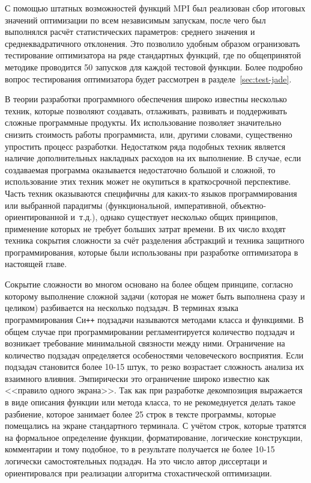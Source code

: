С помощью штатных возможностей функций MPI был реализован сбор
итоговых значений оптимизации по всем независимым запускам, после чего
был выполнялся расчёт статистических параметров: среднего значения и
среднеквадратичного отклонения. Это позволило удобным образом
огранизовать тестирование оптимизатора на ряде стандартных функций,
где по общепринятой методике проводится 50 запусков для каждой
тестовой функции. Более подробно вопрос тестирования оптимизатора
будет рассмотрен в разделе~\ref{sec:test-jade}.

В теории разработки программного обеспечения широко известны несколько
техник, которые позволяют создавать, отлаживать, развивать и
поддерживать сложные программные продукты.  Их использование позволяет
значительно снизить стоимость работы программиста, или, другими
словами, существенно упростить процесс разработки.  Недостатком ряда
подобных техник является наличие дополнительных накладных расходов на
их выполнение.  В случае, если создаваемая программа оказывается
недостаточно большой и сложной, то использование этих техник может не
окупиться в краткосрочной перспективе.  Часть техник оказываются
специфичны для каких-то языков программирования или выбранной
парадигмы (функциональной, императивной, объектно-ориентированной
и~т.д.), однако существует несколько общих принципов, применение
которых не требует больших затрат времени. В их число входят техника
сокрытия сложности за счёт разделения абстракций и техника
защитного программирования, которые были использованы при
разработке  оптимизатора в настоящей главе.

Сокрытие сложности во многом основано на более общем принципе,
согласно которому выполнение сложной задачи (которая не может быть
выполнена сразу и целиком) разбивается на несколько подзадач. В
терминах языка программирования Си\texttt{++} подзадачи называются
методами класса и функциями.  В общем случае при программировании
регламентируется количество подзадач и возникает требование
минимальной связности между ними.  Ограничение на количество подзадач
определяется особеностями человеческого восприятия. Если подзадач
становится более 10-15 штук, то резко возрастает сложность анализа их
взаимного влияния.  Эмпирически это ограничение широко известно как
<<правило одного экрана>>.  Так как при разработке декомпозиция
выражается в виде описания функции или метода класса, то не
рекомеднуется делать такое разбиение, которое занимает более 25 строк
в тексте программы, которые помещались на экране стандартного
терминала.  С учётом строк, которые тратятся на формальное определение
функции, форматирование, логические конструкции, комментарии и тому
подобное, то в результате получается не более 10-15 логически
самостоятельных подзадач. На это число автор диссертаци и
ориентировался при реализации алгоритма стохастической оптимизации.


